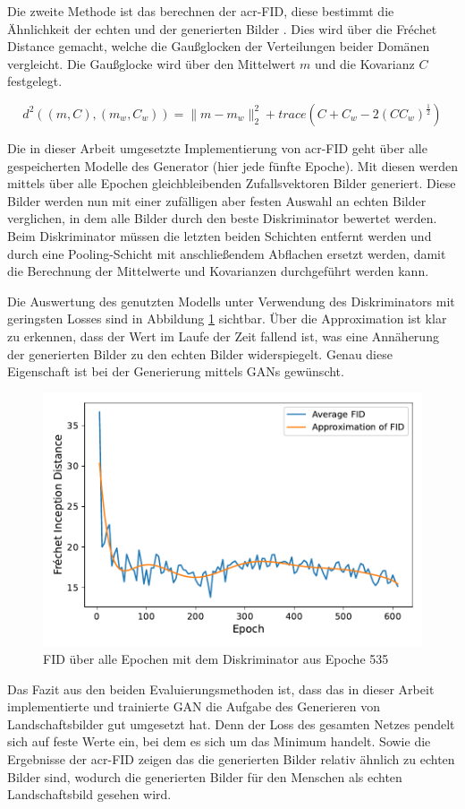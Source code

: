  Die zweite Methode ist das berechnen der \acrfull{acr-FID}, diese bestimmt die
 Ähnlichkeit der echten und der generierten Bilder \cite{heusel_gans_2017}. Dies
 wird über die Fr\'echet Distance gemacht, welche die Gaußglocken der
 Verteilungen beider Domänen vergleicht. Die Gaußglocke wird über den Mittelwert
 $m$ und die Kovarianz $C$ festgelegt. 
 
 \[d^2((m,C),(m_w,C_w)) =  \|m-m_w\|^2_2 + trace(C+ C_w - 2(CC_w)^{\frac{1}{2}})
 \]
 
 Die in dieser Arbeit umgesetzte Implementierung von \gls{acr-FID} geht über
 alle gespeicherten Modelle des Generator (hier jede fünfte Epoche). Mit diesen
 werden  
 mittels über alle Epochen gleichbleibenden Zufallsvektoren Bilder generiert.
 Diese Bilder werden nun mit einer zufälligen aber festen Auswahl an echten
 Bilder verglichen, in dem alle Bilder durch den beste Diskriminator bewertet
 werden. Beim Diskriminator müssen die letzten beiden Schichten entfernt werden
 und durch eine Pooling-Schicht mit anschließendem Abflachen ersetzt werden,
 damit die Berechnung der Mittelwerte und Kovarianzen durchgeführt werden kann. 
 
 Die Auswertung des genutzten Modells unter Verwendung des Diskriminators mit
 geringsten Losses sind in Abbildung \ref{fig:plot_fids_gen} sichtbar. Über die
 Approximation ist klar zu erkennen, dass der Wert im Laufe der Zeit fallend
 ist, was eine Annäherung der generierten Bilder zu den echten Bilder
 widerspiegelt. Genau diese Eigenschaft ist bei der Generierung mittels GANs
 gewünscht.
 
 \begin{figure}
 	\centering
 	\includegraphics[width=0.7\linewidth]{images/plot_line_plot_fids_gen}
 	\caption[FID des generierdene GANs]{FID über alle Epochen mit dem Diskriminator aus Epoche 535}
 	\label{fig:plot_fids_gen}
 \end{figure}
 
 Das Fazit aus den beiden Evaluierungsmethoden ist, dass das in dieser Arbeit
 implementierte und trainierte GAN die Aufgabe des Generieren von
 Landschaftsbilder gut umgesetzt hat. Denn der Loss des gesamten Netzes pendelt
 sich auf feste Werte ein, bei dem es sich um das Minimum handelt. Sowie die
 Ergebnisse der \gls{acr-FID} zeigen das die generierten Bilder relativ ähnlich
 zu echten Bilder sind, wodurch die generierten Bilder für den Menschen als
 echten Landschaftsbild gesehen wird.
 
 